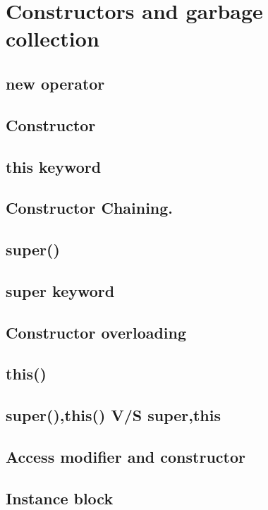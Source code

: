 \documentclass[14pt,fleqn]{extbook} %
\begin{document}
\section{Constructors and garbage collection}

\subsection{new operator}

\subsection{Constructor}

\subsection{this keyword}

\subsection{Constructor Chaining.}

\subsection{super()}

\subsection{super keyword}

\subsection{Constructor overloading}

\subsection{this()}

\subsection{super(),this() V/S super,this}

\subsection{Access modifier and constructor}

\subsection{Instance block}

\end{document}
